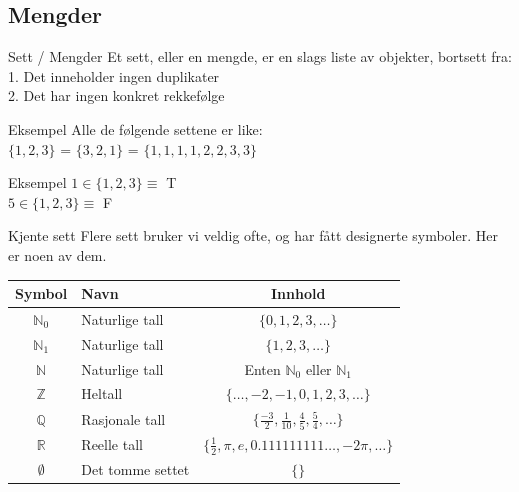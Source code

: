 \subsection{Mengder}

\begin{frame}{Sett / Mengder}
    Et sett, eller en mengde, er en slags liste av objekter, bortsett fra:\\
    \indent \hspace{3mm}    1. Det inneholder ingen duplikater\\
    \indent \hspace{3mm}    2. Det har ingen konkret rekkefølge
    
    \pause
    \begin{block}{Eksempel}
        Alle de følgende settene er like: \\
        $\{1, 2, 3\}$ = $\{3, 2, 1\}$ = $\{1, 1, 1, 1, 2, 2, 3, 3\}$
    \end{block}
    
    \pause
    \begin{block}{Eksempel}
        $1 \in \{1, 2, 3\} \equiv$ T \\
        $5 \in \{1, 2, 3\} \equiv$ F
    \end{block}
\end{frame}


\begin{frame}{Kjente sett}
    Flere sett bruker vi veldig ofte, og har fått designerte symboler. Her er noen av dem.\\
    
    \begin{tabular}{c|l|c}
        Symbol & Navn & Innhold \\ \hline
        $\mathbb{N}_0$ & Naturlige tall & $\{0, 1, 2, 3, \ldots\}$\\
        \pause
        $\mathbb{N}_1$ & Naturlige tall & $\{1, 2, 3, \ldots\}$\\
        \pause
        $\mathbb{N}$ & Naturlige tall & Enten $\mathbb{N}_0$ eller $\mathbb{N}_1$\\
        \pause
        $\mathbb{Z}$ & Heltall & $\{\ldots, -2, -1, 0, 1, 2, 3, \ldots\}$\\
        \pause
        $\mathbb{Q}$ & Rasjonale tall & $\{\frac{-3}{2}, \frac{1}{10}, \frac{4}{5}, \frac{5}{4}, \ldots\}$\\
        \pause
        $\mathbb{R}$ & Reelle tall & $\{\frac{1}{2}, \pi, e, 0.111111111\ldots, -2\pi, \ldots\}$\\
        \pause
        $\emptyset$ & Det tomme settet & $\{\}$
    \end{tabular}
\end{frame}

